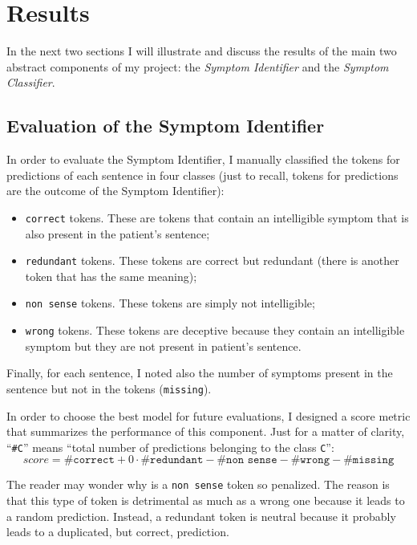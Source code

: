 \chapter{Results}
\label{cha:results}
In the next two sections I will illustrate and discuss the results of the main two abstract components of my project: the \textit{Symptom Identifier} and the \textit{Symptom Classifier}.

\section{Evaluation of the Symptom Identifier}
In order to evaluate the Symptom Identifier, I manually classified the tokens for predictions of each sentence in four classes (just to recall, tokens for predictions are the outcome of the Symptom Identifier):
\begin{itemize}
  \item \texttt{correct} tokens. These are tokens that contain an intelligible symptom that is also present in the patient's sentence;
  \item \texttt{redundant} tokens. These tokens are correct but redundant (there is another token that has the same meaning);
  \item \texttt{non sense} tokens. These tokens are simply not intelligible;
  \item \texttt{wrong} tokens. These tokens are deceptive because they contain an intelligible symptom but they are not present in patient's sentence.
\end{itemize}

Finally, for each sentence, I noted also the number of symptoms present in the sentence but not in the tokens (\texttt{missing}).

In order to choose the best model for future evaluations, I designed a score metric that summarizes the performance of this component. Just for a matter of clarity, ``\texttt{\#C}'' means ``total number of predictions belonging to the class \texttt{C}'':
\begin{equation}
score = \texttt{\#correct} + 0 \cdot \texttt{\#redundant} - \texttt{\#non sense} - \texttt{\#wrong} - \texttt{\#missing}
\end{equation}

The reader may wonder why is a \texttt{non sense} token so penalized. The reason is that this type of token is detrimental as much as a wrong one because it leads to a random prediction. Instead, a redundant token is neutral because it probably leads to a duplicated, but correct, prediction.

